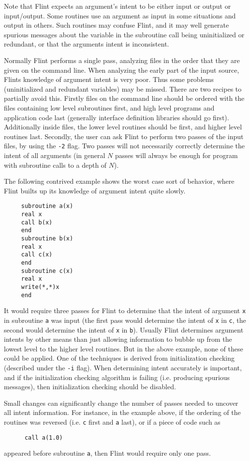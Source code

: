 \documentclass{report}
\begin{document}
Note that Flint expects an argument's intent to be either input or output
or input/output. Some routines use an argument as input in some situations
and output in others. Such routines may confuse Flint, and it
may well generate spurious messages about the variable in the subroutine
call being uninitialized or redundant, or that the arguments intent is
inconsistent.

Normally Flint performs a single pass, analyzing files in the order that they
are given on the command line. When analyzing the early part of the
input source, Flints knowledge of argument intent is very poor. Thus some
problems (uninitialized and redundant variables) may be missed. There are
two recipes to partially avoid this. Firstly files on the command line
should be ordered with the files containing low level subroutines first,
and high level programs and application code last (generally interface
definition libraries should go first). Additionally inside files, the lower
level routines should be first, and higher level routines last. Secondly,
the user can ask Flint to perform two passes of the input files, by using
the {\tt -2} flag. Two passes will not necessarily correctly
determine the intent of all arguments  (in general $N$ passes will always
be enough for program with subroutine calls to a depth of $N$).

The following contrived example shows the worst case sort of behavior,
where Flint builts up its knowledge of argument intent quite slowly.
\begin{verbatim}
     subroutine a(x)
     real x
     call b(x)
     end
     subroutine b(x)
     real x
     call c(x)
     end
     subroutine c(x)
     real x
     write(*,*)x
     end
\end{verbatim}
It would require three passes for Flint to determine that the
intent of argument {\tt x} in subroutine {\tt a} was input
(the first pass would determine the intent of {\tt x} in {\tt c}, the
second would determine the intent of {\tt x} in {\tt b}). Usually
Flint determines argument intents by other means than just allowing information
to bubble up from the lowest level to the higher level routines. But in the
above example, none of these could be applied. One of the techniques is
derived from initialization checking (described under the {\tt -i} flag).
When determining intent accurately is important, and if the initialization
checking algorithm is failing (i.e. producing spurious messages), then
initialization checking should be disabled.

Small changes can significantly change the number of passes needed to uncover
all intent information. For instance, in the example above, if
the ordering of the routines was reversed (i.e. {\tt c} first and {\tt a}
last), or if a piece of code such as
\begin{verbatim}
      call a(1.0)
\end{verbatim}
appeared before subroutine {\tt a}, then Flint would require only one pass.
\end{document}
